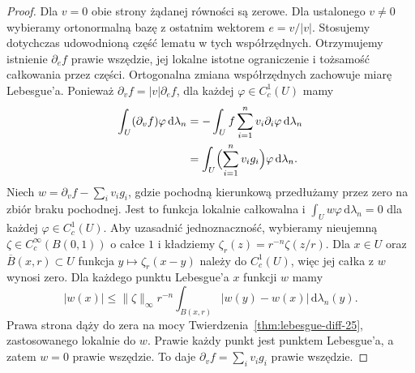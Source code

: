 \begin{proof}
Dla $v=0$ obie strony żądanej równości są zerowe.
Dla ustalonego $v\ne0$ wybieramy ortonormalną bazę
z ostatnim wektorem $e=v/|v|$. Stosujemy dotychczas
udowodnioną część lematu w tych współrzędnych.
Otrzymujemy istnienie $\partial_e f$ prawie wszędzie,
jej lokalne istotne ograniczenie i tożsamość całkowania
przez części. Ortogonalna zmiana współrzędnych
zachowuje miarę Lebesgue'a. Ponieważ
$\partial_v f=|v|\partial_e f$, dla każdej
$\varphi\in C_c^1(U)$ mamy
\begin{align*}
 \int_U(\partial_v f)\varphi\,\mathrm d\lambda_n
 &=-\int_U f\sum_{i=1}^n v_i\partial_i\varphi\,\mathrm d\lambda_n\\
 &=\int_U\Bigl(\sum_{i=1}^n v_i g_i\Bigr)\varphi\,\mathrm d\lambda_n.
\end{align*}
Niech $w=\partial_v f-\sum_i v_i g_i$, gdzie
pochodną kierunkową przedłużamy przez zero na zbiór
braku pochodnej. Jest to funkcja lokalnie całkowalna
i $\int_U w\varphi\,\mathrm d\lambda_n=0$
dla każdej $\varphi\in C_c^1(U)$.
Aby uzasadnić jednoznaczność, wybieramy nieujemną
$\zeta\in C_c^\infty(B(0,1))$ o całce $1$
i kładziemy $\zeta_r(z)=r^{-n}\zeta(z/r)$.
Dla $x\in U$ oraz $\overline B(x,r)\subset U$
funkcja $y\mapsto\zeta_r(x-y)$ należy do $C_c^1(U)$,
więc jej całka z $w$ wynosi zero.
Dla każdego punktu Lebesgue'a $x$ funkcji $w$ mamy
\[
 |w(x)|\le \|\zeta\|_\infty r^{-n}
 \int_{B(x,r)}|w(y)-w(x)|\,\mathrm d\lambda_n(y).
\]
Prawa strona dąży do zera na mocy
Twierdzenia~\ref{thm:lebesgue-diff-25},
zastosowanego lokalnie do $w$. Prawie każdy punkt
jest punktem Lebesgue'a, a zatem $w=0$
prawie wszędzie. To daje
$\partial_v f=\sum_i v_i g_i$ prawie wszędzie.
\end{proof}

